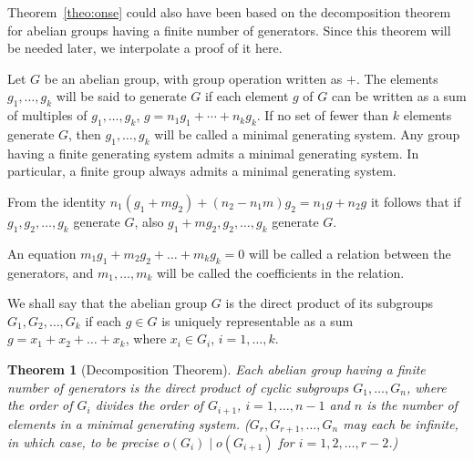 \documentclass[10pt,leqno,a5paper]{book}
\newtheorem*{theo*}{Theorem}
\theoremstyle{definition}
\begin{document}
Theorem~\ref{theo:onse} could also have been based on the decomposition theorem for abelian groups having a finite number of generators.
Since this theorem will be needed later, we interpolate a proof of it here.


Let $G$ be an abelian group, with group operation written as $+$.
The elements $g_1, \ldots, g_k$ will be said to generate $G$ if each element $g$ of $G$ can be written as a sum of multiples of $g_1, \ldots, g_k$, $g = n_1g_1 + \cdots + n_k g_k$.
If no set of fewer than $k$ elements generate $G$, then $g_1, \ldots, g_k$ will be called a minimal generating system.
Any group having a finite generating system admits a minimal generating system.
In particular, a finite group always admits a minimal generating system.

From the identity $n_1(g_1 + m g_2) + (n_2 - n_1m) g_2 = n_1 g + n_2 g$ it follows that if $g_1, g_2, \ldots, g_k$ generate $G$, also $g_1 + m g_2, g_2, \ldots, g_k$ generate $G$.

An equation $m_1 g_1 + m_2 g_2 + \ldots + m_k g_k = 0$ will be called a relation between the generators, and $m_1, \ldots, m_k$ will be called the coefficients in the relation.

We shall say that the abelian group $G$ is the direct product of its subgroups $G_1, G_2, \ldots, G_k$ if each $g \in G$ is uniquely representable as a sum $g = x_1 + x_2 + \ldots + x_k$, where $x_i \in G_i$, $i=1,\ldots,k$.


\begin{theo*}[Decomposition Theorem]
Each abelian group having a finite number of generators is the direct product of cyclic subgroups $G_1, \ldots, G_n$, where the order of $G_i$ divides the order of $G_{i+1}$, $i=1,\ldots,n-1$ and $n$ is the number of elements in a minimal generating system.
($G_r, G_{r+1}, \ldots, G_n$ may each be infinite, in which case, to be precise $o(G_i) \mid o(G_{i+1})$ for $i=1,2,\ldots,r-2$.)
\end{theo*}
\end{document}
